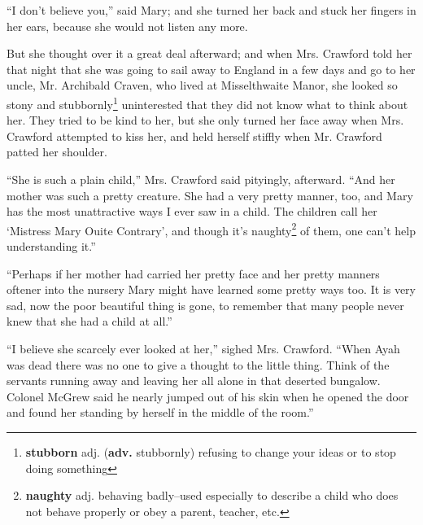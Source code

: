``I don't believe you,'' said Mary; and she turned her back and stuck her fingers in her ears, because she would not listen any more.

But she thought over it a great deal afterward; and when Mrs. Crawford told her that night that she was going to sail away to England in a few days and go to her uncle, Mr. Archibald Craven, who lived at Misselthwaite Manor, she looked so stony and stubbornly\footnote{\textbf{stubborn} adj. (\textbf{adv.} stubbornly) refusing to change your ideas or to stop doing something} uninterested that they did not know what to think about her. They tried to be kind to her, but she only turned her face away when Mrs. Crawford attempted to kiss her, and held herself stiffly when Mr. Crawford patted her shoulder.

``She is such a plain child,'' Mrs. Crawford said pityingly, afterward. ``And her mother was such a pretty creature. She had a very pretty manner, too, and Mary has the most unattractive ways I ever saw in a child. The children call her `Mistress Mary Ouite Contrary', and though it's naughty\footnote{\textbf{naughty} adj. behaving badly--used especially to describe a child who does not behave properly or obey a parent, teacher, etc.} of them, one can't help understanding it.''

``Perhaps if her mother had carried her pretty face and her pretty manners oftener into the nursery Mary might have learned some pretty ways too. It is very sad, now the poor beautiful thing is gone, to remember that many people never knew that she had a child at all.''

``I believe she scarcely ever looked at her,'' sighed Mrs. Crawford. ``When Ayah was dead there was no one to give a thought to the little thing. Think of the servants running away and leaving her all alone in that deserted bungalow. Colonel McGrew said he nearly jumped out of his skin when he opened the door and found her standing by herself in the middle of the room.''
